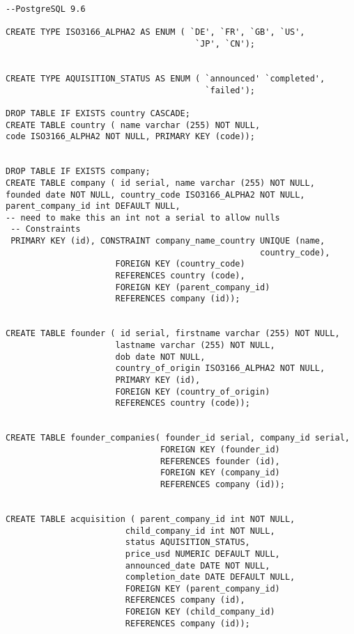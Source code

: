 \documentclass[12pt]{article}
\begin{document}
\begin{verbatim}
--PostgreSQL 9.6

CREATE TYPE ISO3166_ALPHA2 AS ENUM ( `DE', `FR', `GB', `US',
                                      `JP', `CN');


CREATE TYPE AQUISITION_STATUS AS ENUM ( `announced' `completed',
                                        `failed');

DROP TABLE IF EXISTS country CASCADE;
CREATE TABLE country ( name varchar (255) NOT NULL,
code ISO3166_ALPHA2 NOT NULL, PRIMARY KEY (code));


DROP TABLE IF EXISTS company;
CREATE TABLE company ( id serial, name varchar (255) NOT NULL,
founded date NOT NULL, country_code ISO3166_ALPHA2 NOT NULL,
parent_company_id int DEFAULT NULL,
-- need to make this an int not a serial to allow nulls
 -- Constraints
 PRIMARY KEY (id), CONSTRAINT company_name_country UNIQUE (name,
                                                   country_code),
                      FOREIGN KEY (country_code)
                      REFERENCES country (code),
                      FOREIGN KEY (parent_company_id)
                      REFERENCES company (id));


CREATE TABLE founder ( id serial, firstname varchar (255) NOT NULL,
                      lastname varchar (255) NOT NULL,
                      dob date NOT NULL,
                      country_of_origin ISO3166_ALPHA2 NOT NULL,
                      PRIMARY KEY (id),
                      FOREIGN KEY (country_of_origin)
                      REFERENCES country (code));


CREATE TABLE founder_companies( founder_id serial, company_id serial,
                               FOREIGN KEY (founder_id)
                               REFERENCES founder (id),
                               FOREIGN KEY (company_id)
                               REFERENCES company (id));


CREATE TABLE acquisition ( parent_company_id int NOT NULL,
                        child_company_id int NOT NULL,
                        status AQUISITION_STATUS,
                        price_usd NUMERIC DEFAULT NULL,
                        announced_date DATE NOT NULL,
                        completion_date DATE DEFAULT NULL,
                        FOREIGN KEY (parent_company_id)
                        REFERENCES company (id),
                        FOREIGN KEY (child_company_id)
                        REFERENCES company (id));

\end{verbatim}
\end{document}
